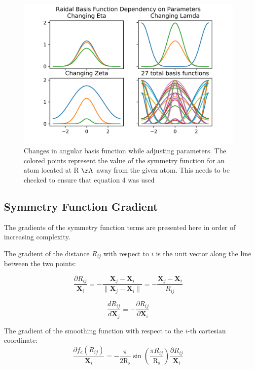 \documentclass{article}
\newcommand{\mb}[1]{\mathbf{#1}}
\begin{document}
\begin{figure}
	\includegraphics[width=\linewidth]{./img/ang_graphs.png}	\caption{Changes in angular basis function while adjusting parameters. The colored points represent the value of the symmetry function for an atom located at R $\mathrm{\AA}$ away from the given atom. This needs to be checked to ensure that equation 4 was used}
	\label{fig:ang_funcs}
\end{figure}
\newpage
\subsection{Symmetry Function Gradient}
The gradients of the symmetry function terms are presented here in order of increasing complexity.

The gradient of the distance $R_{ij}$ with respect to $i$ is the unit vector along the line between the two points:

\begin{equation}
\frac{\partial R_{ij}}{\mb{X}_{i}} = -\frac{\mathbf{X}_j-\mathbf{X}_i}{\lVert \mathbf{X}_j - \mathbf{X}_i \rVert} = -\frac{\mathbf{X}_j-\mathbf{X}_i}{R_{ij}}
\end{equation}

\begin{equation}
\frac{d R_{ij}}{d \mb{X}_{j}} = - \frac{\partial R_{ij}}{\partial\mb{X}_{i}}
\end{equation}

The gradient of the smoothing function with respect to the ${i}$-th cartesian coordinate:
\begin{equation}
\frac{\partial f_c (R_{ij}) } { \mb{X}_{i}} = -\frac{\pi}{2 
 \mathrm{R_s}}  \sin ( \frac{\pi R_{ij}}{\mathrm{R_s}}) \frac{\partial R_{ij}}{\mb{X}_{i}}
\end{equation}
\end{document}
